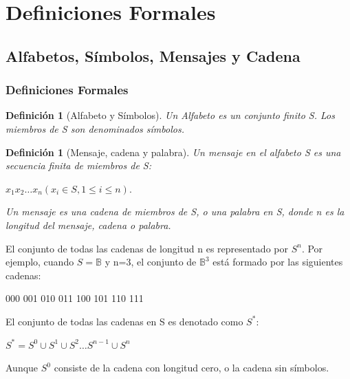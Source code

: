 \documentclass{beamer}
\newtheorem{definicion} [Definicion]{Definición}
\begin{document}
\section{Definiciones Formales}\label{sec:defba}

\subsection{Alfabetos, Símbolos, Mensajes y Cadena}

\begin{frame} \frametitle{Definiciones Formales}


\begin{definicion} [Alfabeto y Símbolos]
Un Alfabeto es un conjunto finito S. Los miembros de S son denominados símbolos.
\end{definicion}


\begin{definicion} [Mensaje, cadena y palabra]
Un mensaje en el alfabeto S es una secuencia finita de miembros de S:

\begin{center} $x_{1}x_{2} \ldots x_{n} (x_{i} \in S, 1 \leq i \leq n).$\end{center}
Un mensaje es una cadena de miembros de S, o una palabra en S, donde n es la longitud del mensaje, cadena o palabra.
\end{definicion}

\end{frame}


\begin{frame} 

El conjunto de todas las cadenas de longitud n es representado por $S^{n}$. Por ejemplo, cuando  $S=\mathbb{B}$ y n=3, el conjunto de $\mathbb{B}^{3}$ está formado por las siguientes cadenas:

\begin{center}
000 001 010 011 100 101 110 111
\end{center}

El conjunto de todas las cadenas en  S es denotado como $S^{*}$:
\begin{center}
$S^{*} =S^{0}\cup S^{1}\cup S^{2}\ldots S^{n-1} \cup S^{n} $
\end{center}

Aunque $S^{0}$ consiste de la cadena con longitud cero, o la cadena sin símbolos.

\end{frame}
\end{document}
